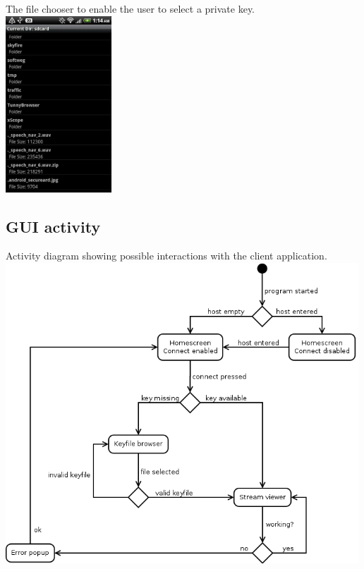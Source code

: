 \documentclass[a4paper,10pt]{scrartcl}
\begin{document}
\begin{illustration}{The file chooser to enable the user to select a private key.}
\includegraphics[width=150px]{figures/images/fileChooser.png}
\end{illustration}

\subsection{GUI activity}
\begin{illustration}{Activity diagram showing possible interactions with the client application.}
\includegraphics [width=500px]{figures/gui_activity_1/gui_activity_1.png}
\end{illustration}
\end{document}
